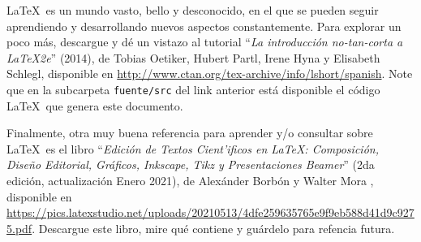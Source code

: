\documentclass[11pt]{exam}
\begin{document}
\begin{questions}
\item \LaTeX\ es un mundo vasto, bello y desconocido, en el que se pueden seguir aprendiendo y desarrollando nuevos aspectos constantemente. Para explorar un poco más, descargue y dé un vistazo al tutorial ``\textit{La introducción no-tan-corta a \LaTeX 2e}'' (2014), de Tobias Oetiker, Hubert Partl, Irene Hyna y Elisabeth Schlegl, disponible en \url{http://www.ctan.org/tex-archive/info/lshort/spanish}. Note que en la subcarpeta \texttt{fuente/src} del link anterior está disponible el código \LaTeX\, que genera este documento.

\item Finalmente, otra muy buena referencia para aprender y/o consultar sobre \LaTeX\ es el libro ``\textit{Edición de Textos Cient'ificos en \LaTeX: Composición, Dise\~no Editorial, Gráficos, Inkscape, Tikz y Presentaciones Beamer}'' (2da edición, actualización Enero 2021), de Alexánder Borbón y Walter Mora , disponible en \url{https://pics.latexstudio.net/uploads/20210513/4dfe259635765e9f9eb588d41d9c9275.pdf}. Descargue este libro, mire qué contiene y guárdelo para refencia futura.
\end{questions}
\end{document}
